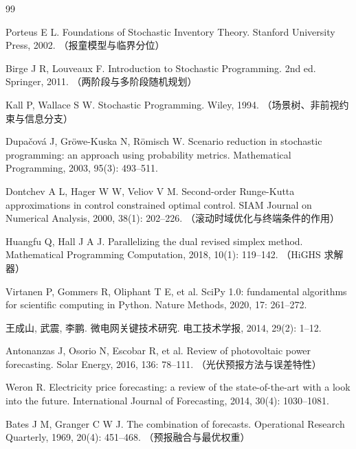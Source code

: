\renewcommand{\refname}{参考文献}
\begin{thebibliography}{99}
\setlength{\itemsep}{2pt}

Porteus E L. Foundations of Stochastic Inventory Theory.
Stanford University Press, 2002. （报童模型与临界分位）

Birge J R, Louveaux F. Introduction to Stochastic Programming.
2nd ed. Springer, 2011. （两阶段与多阶段随机规划）

Kall P, Wallace S W. Stochastic Programming. Wiley, 1994.
（场景树、非前视约束与信息分支）

Dupačová J, Gröwe-Kuska N, Römisch W. Scenario reduction in stochastic programming:
an approach using probability metrics. Mathematical Programming, 2003, 95(3): 493--511.

Dontchev A L, Hager W W, Veliov V M. Second-order Runge-Kutta approximations in
control constrained optimal control. SIAM Journal on Numerical Analysis, 2000, 38(1): 202--226.
（滚动时域优化与终端条件的作用）

Huangfu Q, Hall J A J. Parallelizing the dual revised simplex method.
Mathematical Programming Computation, 2018, 10(1): 119--142. （HiGHS 求解器）

Virtanen P, Gommers R, Oliphant T E, et al. SciPy 1.0: fundamental algorithms for
scientific computing in Python. Nature Methods, 2020, 17: 261--272.

王成山, 武震, 李鹏. 微电网关键技术研究. 电工技术学报, 2014, 29(2): 1--12.

Antonanzas J, Osorio N, Escobar R, et al. Review of photovoltaic power forecasting.
Solar Energy, 2016, 136: 78--111. （光伏预报方法与误差特性）

Weron R. Electricity price forecasting: a review of the state-of-the-art with a look
into the future. International Journal of Forecasting, 2014, 30(4): 1030--1081.

Bates J M, Granger C W J. The combination of forecasts.
Operational Research Quarterly, 1969, 20(4): 451--468. （预报融合与最优权重）

\end{thebibliography}
